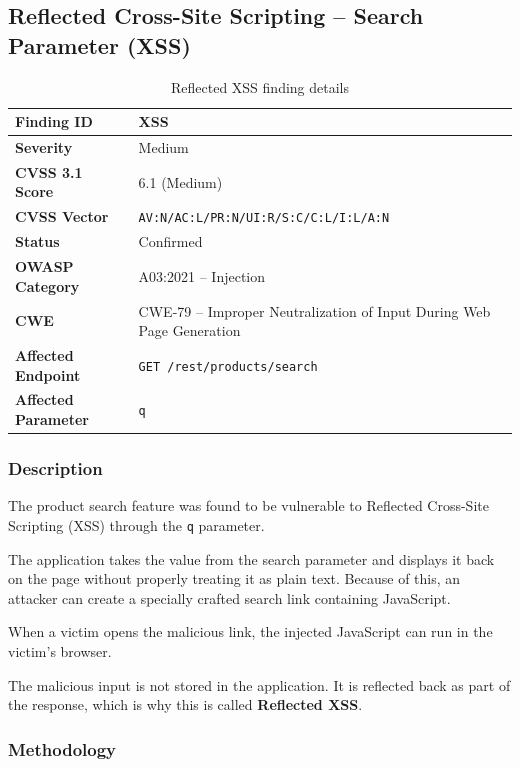 \subsection*{Reflected Cross-Site Scripting -- Search Parameter (XSS)}

\begin{table}[H]
\centering
\begin{tabular}{|l|p{10cm}|}
\hline
\textbf{Finding ID} & XSS \\
\hline
\textbf{Severity} & Medium \\
\hline
\textbf{CVSS 3.1 Score} & 6.1 (Medium) \\
\hline
\textbf{CVSS Vector} & \texttt{AV:N/AC:L/PR:N/UI:R/S:C/C:L/I:L/A:N} \\
\hline
\textbf{Status} & Confirmed \\
\hline
\textbf{OWASP Category} & A03:2021 -- Injection \\
\hline
\textbf{CWE} & CWE-79 -- Improper Neutralization of Input During Web Page Generation \\
\hline
\textbf{Affected Endpoint} & \texttt{GET /rest/products/search} \\
\hline
\textbf{Affected Parameter} & \texttt{q} \\
\hline
\end{tabular}
\caption{Reflected XSS finding details}
\end{table}

\subsubsection*{Description}

The product search feature was found to be vulnerable to
Reflected Cross-Site Scripting (XSS) through the \texttt{q}
parameter.

The application takes the value from the search parameter and
displays it back on the page without properly treating it as
plain text. Because of this, an attacker can create a specially
crafted search link containing JavaScript.

When a victim opens the malicious link, the injected JavaScript
can run in the victim's browser.

The malicious input is not stored in the application. It is
reflected back as part of the response, which is why this is
called \textbf{Reflected XSS}.

\subsubsection*{Methodology}

